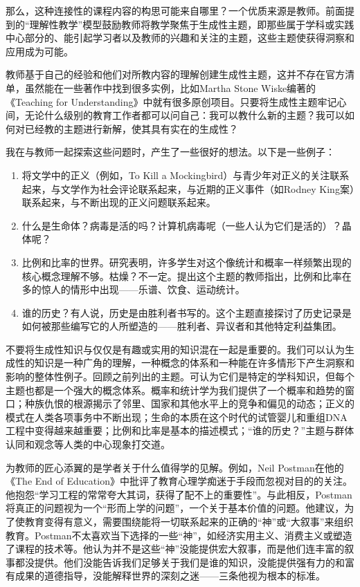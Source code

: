 那么，这种连接性的课程内容的构思可能来自哪里？一个优质来源是教师。前面提到的“理解性教学”模型鼓励教师将教学聚焦于生成性主题，即那些属于学科或实践中心部分的、能引起学习者以及教师的兴趣和关注的主题，这些主题使获得洞察和应用成为可能。

教师基于自己的经验和他们对所教内容的理解创建生成性主题，这并不存在官方清单，虽然能在一些著作中找到很多实例，比如Martha Stone Wiske编著的《Teaching for Understanding》中就有很多原创项目。只要将生成性主题牢记心间，无论什么级别的教育工作者都可以问自己：我可以教什么新的主题？我可以如何对已经教的主题进行新解，使其具有实在的生成性？

我在与教师一起探索这些问题时，产生了一些很好的想法。以下是一些例子：
\begin{enumerate}
    \item 将文学中的正义（例如，To Kill a Mockingbird）与青少年对正义的关注联系起来，与文学作为社会评论联系起来，与近期的正义事件（如Rodney King案）联系起来，与不断出现的正义问题联系起来。
    \item 什么是生命体？病毒是活的吗？计算机病毒呢（一些人认为它们是活的）？晶体呢？
    \item 比例和比率的世界。研究表明，许多学生对这个像统计和概率一样频繁出现的核心概念理解不够。枯燥？不一定。提出这个主题的教师指出，比例和比率在多的惊人的情形中出现——乐谱、饮食、运动统计。
    \item 谁的历史？有人说，历史是由胜利者书写的。这个主题直接探讨了历史记录是如何被那些编写它的人所塑造的——胜利者、异议者和其他特定利益集团。
\end{enumerate}

不要将生成性知识与仅仅是有趣或实用的知识混在一起是重要的。我们可以认为生成性的知识是一种广角的理解，一种概念的体系和一种能在许多情形下产生洞察和影响的整体性例子。回顾之前列出的主题。可认为它们是特定的学科知识，但每个主题也都是一个强大的概念体系。概率和统计学为我们提供了一个概率和趋势的窗口；种族仇恨的根源揭示了邻里、国家和其他水平上的竞争和偏见的动态；正义的模式在人类各项事务中不断出现；生命的本质在这个时代的试管婴儿和重组DNA工程中变得越来越重要；比例和比率是基本的描述模式；“谁的历史？”主题与群体认同和观念等人类的中心现象打交道。

为教师的匠心添翼的是学者关于什么值得学的见解。例如，Neil Postman在他的《The End of Education》中批评了教育心理学痴迷于手段而忽视对目的的关注。他抱怨“学习工程的常常夸大其词，获得了配不上的重要性”。与此相反，Postman将真正的问题视为一个“形而上学的问题”，一个关于基本价值的问题。他建议，为了使教育变得有意义，需要围绕能将一切联系起来的正确的“神”或“大叙事”来组织教育。Postman不太喜欢当下选择的一些“神”，如经济实用主义、消费主义或塑造了课程的技术等。他认为并不是这些“神”没能提供宏大叙事，而是他们连丰富的叙事都没提供。他们没能告诉我们足够关于我们是谁的知识，没能提供强有力的和富有成果的道德指导，没能解释世界的深刻之迷——三条他视为根本的标准。

